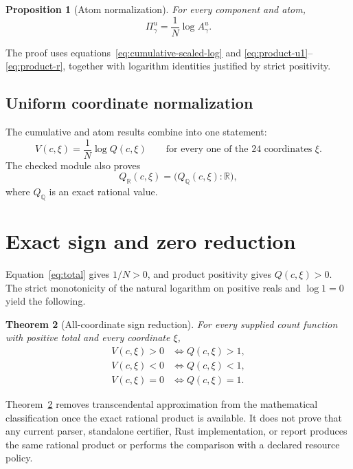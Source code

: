 \documentclass[11pt]{article}
\newtheorem{theorem}{Theorem}[section]
\newtheorem{proposition}[theorem]{Proposition}
\theoremstyle{definition}
\begin{document}
\begin{proposition}[Atom normalization]\label{prop:atom-product}
For every component and atom,
\begin{equation}\label{eq:atom-scaled-log}
\Pi^u_\gamma=\frac1N\log A^u_\gamma.
\end{equation}
\end{proposition}

The proof uses equations~\eqref{eq:cumulative-scaled-log} and
\eqref{eq:product-u1}--\eqref{eq:product-r}, together with logarithm identities justified by
strict positivity.

\subsection{Uniform coordinate normalization}

The cumulative and atom results combine into one statement:
\begin{equation}\label{eq:all-coordinate-log}
V(c,\xi)=\frac1N\log Q(c,\xi)
\qquad\text{for every one of the 24 coordinates }\xi.
\end{equation}
The checked module also proves
\begin{equation}\label{eq:rational-cast}
Q_{\mathbb R}(c,\xi)
=\bigl(Q_{\mathbb Q}(c,\xi):\mathbb R\bigr),
\end{equation}
where \(Q_{\mathbb Q}\) is an exact rational value.

\section{Exact sign and zero reduction}

Equation~\eqref{eq:total} gives \(1/N>0\), and product positivity gives
\(Q(c,\xi)>0\).  The strict
monotonicity of the natural logarithm on positive reals and \(\log 1=0\) yield the following.

\begin{theorem}[All-coordinate sign reduction]\label{thm:sign}
For every supplied count function with positive total and every coordinate \(\xi\),
\begin{align}
V(c,\xi)>0&\iff Q(c,\xi)>1,\label{eq:positive-iff}\\
V(c,\xi)<0&\iff Q(c,\xi)<1,\label{eq:negative-iff}\\
V(c,\xi)=0&\iff Q(c,\xi)=1.\label{eq:zero-iff}
\end{align}
\end{theorem}

Theorem~\ref{thm:sign} removes transcendental approximation from the mathematical classification
once the exact rational product is available.  It does not prove that any current parser,
standalone certifier, Rust implementation, or report produces the same rational product or performs
the comparison with a declared resource policy.
\end{document}
